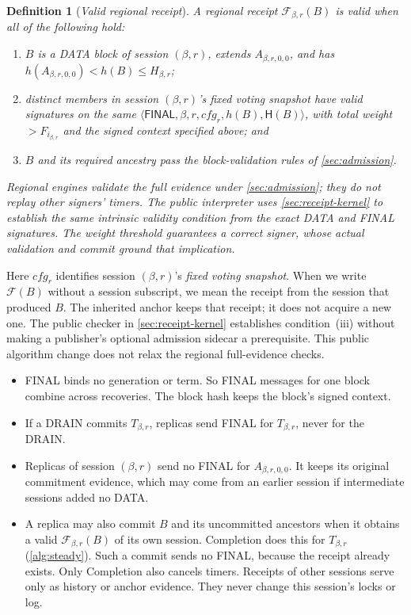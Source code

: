 \documentclass[11pt,a4paper]{article}
\newcommand{\FC}{\mathcal F}
\newcommand{\Hash}{\mathsf H}
\newcommand{\tagg}[1]{\ensuremath{\mathsf{#1}}}
\newcommand{\defterm}[1]{\textcolor{rrBlue}{\textit{#1}}}
\newtheorem{definition}{Definition}[section]
\begin{document}
\begin{definition}[\defterm{Valid regional receipt}]
\label{def:receipt}
A regional receipt $\FC_{\beta,r}(B)$ is valid when all of the following hold:
\begin{enumerate}[label=(\roman*)]
\item $B$ is a DATA block of session $(\beta,r)$, extends $A_{\beta,r,0,0}$, and has
$h(A_{\beta,r,0,0})<h(B)\le H_{\beta,r}$;
\item distinct members in session $(\beta,r)$'s fixed voting snapshot have
valid signatures on the same
$\langle\tagg{FINAL},\beta,r,\mathit{cfg}_r,h(B),\Hash(B)\rangle$,
with total weight $>F_{i_{\beta,r}}$ and the signed context specified above; and
\item $B$ and its required ancestry pass the block-validation rules of
\cref{sec:admission}.
\end{enumerate}
Regional engines validate the full evidence under \cref{sec:admission};
they do not replay other signers' timers. The public interpreter uses
\cref{sec:receipt-kernel} to establish the same intrinsic validity
condition from the exact DATA and FINAL signatures. The weight threshold
guarantees a correct signer, whose actual validation and commit ground
that implication.
\end{definition}
Here $\mathit{cfg}_r$ identifies session $(\beta,r)$'s \defterm{fixed voting snapshot}.
When we write $\FC(B)$ without a session subscript, we mean the receipt
from the session that produced $B$. The inherited anchor keeps that
receipt; it does not acquire a new one. The public checker in \cref{sec:receipt-kernel} establishes
condition~(iii) without making a publisher's optional admission sidecar a
prerequisite. This public algorithm change does not relax the regional
full-evidence checks.
\begin{itemize}
\item FINAL binds no generation or term. So FINAL messages for one block
combine across recoveries. The block hash keeps the block's signed
context.
\item If a DRAIN commits $T_{\beta,r}$, replicas send FINAL for $T_{\beta,r}$, never for
the DRAIN.
\item Replicas of session $(\beta,r)$ send no FINAL for $A_{\beta,r,0,0}$. It keeps its original commitment evidence, which may come from an
earlier session if intermediate sessions added no DATA.
\item A replica may also commit $B$ and its uncommitted
ancestors when it obtains a valid $\FC_{\beta,r}(B)$ of its own session.
Completion does this for $T_{\beta,r}$ (\cref{alg:steady}). Such a commit
sends no FINAL, because the receipt already exists. Only Completion
also cancels timers. Receipts of other sessions serve only as history or anchor
evidence. They never change this session's locks or log.
\end{itemize}
\end{document}
